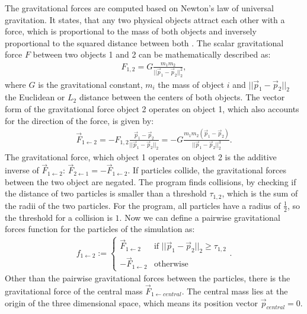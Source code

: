 \documentclass[twoside,11pt]{article}
\begin{document}
The gravitational forces are computed based on Newton's law of
universal gravitation.
It states, that any two physical objects attract each other
with a force, which is proportional to the mass of both objects and
inversely proportional to the squared distance between both
\citep{feynman1963}.
The scalar gravitational force $F$ between two objects 1 and 2 can be
mathematically described as:
\begin{align}
  F_{1,2} = G\frac{m_1 m_2}{||\vec{p}_1 - \vec{p}_2||_2^2},
\end{align}
where $G$ is the gravitational constant, $m_i$ the mass of object $i$
and $||\vec{p}_1 - \vec{p}_2||_2$ the Euclidean or $L_2$ distance
between the centers of both objects.
The vector form of the gravitational force object 2 operates on object
1, which also accounts for the direction of the force, is given by:
\begin{align}
  \vec{F}_{1\leftarrow2} = -F_{1,2}\frac{\vec{p}_1 - \vec{p}_2}
                   {||\vec{p}_1 - \vec{p}_2||_2}
          = -G\frac{m_1 m_2 (\vec{p}_1 - \vec{p}_2)}
                   {||\vec{p}_1 - \vec{p}_2||_2^3}.
\end{align}
The gravitational force, which object 1 operates on object 2 is the
additive inverse of $\vec{F}_{1 \leftarrow 2}$:
$\vec{F}_{2 \leftarrow 1} = -\vec{F}_{1 \leftarrow 2}$.
If particles collide, the gravitational forces between the two object
are negated.
The program finds collisions, by checking if the distance of two
particles is smaller than a threshold $\tau_{1,2}$, which is the sum
of the radii of the two particles.
For the program, all particles have a radius of $\frac{1}{2}$, so the
threshold for a collision is $1$.
Now we can define a pairwise gravitational forces function for the
particles of the simulation as:
\begin{align}
  f_{1 \leftarrow 2} := \begin{cases}
    \vec{F}_{1 \leftarrow 2} &\text{if }
      ||\vec{p}_1 - \vec{p}_2||_2 \ge \tau_{1,2} \\
    -\vec{F}_{1 \leftarrow 2} &\text{otherwise}
  \end{cases}.
\end{align}
Other than the pairwise gravitational forces between the particles,
there is the gravitational force of the central mass
$\vec{F}_{1 \leftarrow central}$.
The central mass lies at the origin of the three dimensional space,
which means its position vector $\vec{p}_{central} = 0$.
\end{document}
